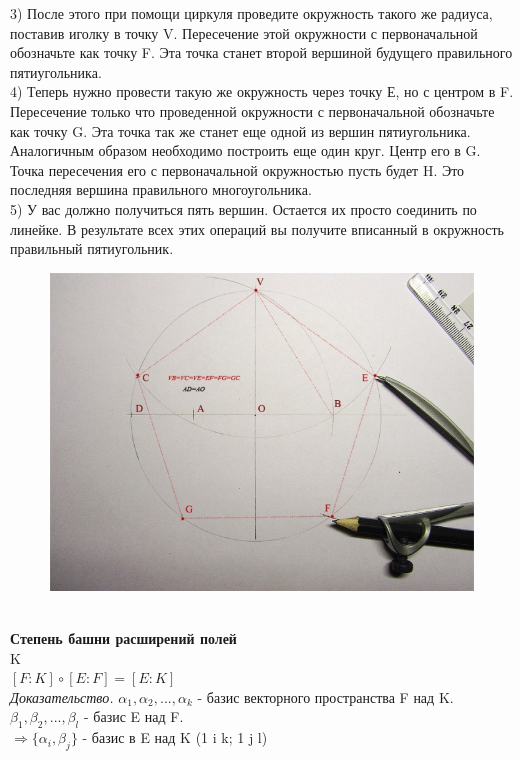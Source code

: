 \documentclass[12pt, oneside]{book}
\theoremstyle{definition}
\renewcommand{\leq}{\leqslant}
\begin{document}
\begin{enumerate}
3) После этого при помощи циркуля проведите окружность такого же радиуса, поставив иголку в точку V. Пересечение этой окружности с первоначальной обозначьте как точку F. Эта точка станет второй вершиной будущего правильного пятиугольника.\\
4) Теперь нужно провести такую же окружность через точку Е, но с центром в F. Пересечение только что проведенной окружности с первоначальной обозначьте как точку G. Эта точка так же станет еще одной из вершин пятиугольника. Аналогичным образом необходимо построить еще один круг. Центр его в G. Точка пересечения его с первоначальной окружностью пусть будет H. Это последняя вершина правильного многоугольника.\\
5) У вас должно получиться пять вершин. Остается их просто соединить по линейке. В результате всех этих операций вы получите вписанный в окружность правильный пятиугольник.\\
\begin{figure}[h!]
\centering
\includegraphics[scale=0.6]{14-1.PNG}
\end{figure}\\
\textbf{Степень башни расширений полей}\\
{K}  \\
$[{F}:{K}] \circ [{E}:{F}] = [{E}:{K}]$\\
\textit{Доказательство.} ${\alpha_1},{\alpha_2},...,{\alpha_k}$ - базис векторного пространства {F} над {K}. ${\beta_1},{\beta_2},...,{\beta_l}$ - базис {E} над {F}.\\
$\Rightarrow \{{\alpha_i},{\beta_j}\}$ - базис в {E} над {K} (1 \leq i \leq k; 1 \leq j \leq l)\\

\end{enumerate}
\end{document}
